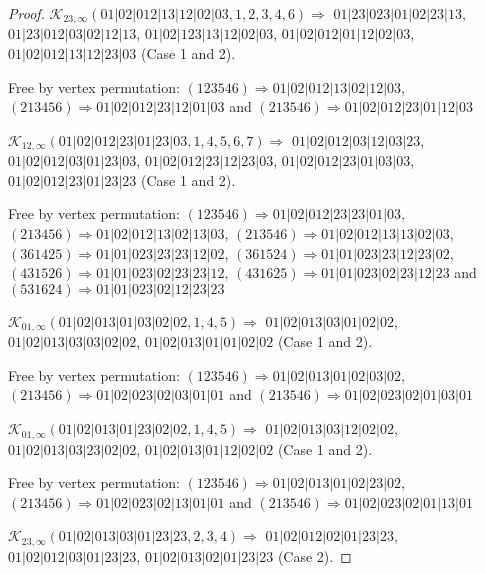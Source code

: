 \documentclass[12pt]{article}
\theoremstyle{plain}
\theoremstyle{definition}
\theoremstyle{remark}
\newcommand{\fancy}[1]{\mathcal{#1}}
\def\K{\fancy{K}}
\begin{document}
\begin{proof}
	
	\bigskip
	
	$\K_{23,\infty}(01|02|012|13|12|02|03,1, 2, 3, 4, 6)\Rightarrow $ $01|23|023|01|02|23|13$, $01|23|012|03|02|12|13$, $01|02|123|13|12|02|03$, $01|02|012|01|12|02|03$, $01|02|012|13|12|23|03$ (Case 1 and 2).
	
	
	
	Free by vertex permutation: $(1 2 3 5 4 6)\Rightarrow 01|02|012|13|02|12|03$, $(2 1 3 4 5 6)\Rightarrow 01|02|012|23|12|01|03$ and $(2 1 3 5 4 6)\Rightarrow 01|02|012|23|01|12|03$
	
	
	\bigskip
	
	$\K_{12,\infty}(01|02|012|23|01|23|03,1, 4, 5, 6, 7)\Rightarrow $ $01|02|012|03|12|03|23$, $01|02|012|03|01|23|03$, $01|02|012|23|12|23|03$, $01|02|012|23|01|03|03$, $01|02|012|23|01|23|23$ (Case 1 and 2).
	
	
	
	Free by vertex permutation: $(1 2 3 5 4 6)\Rightarrow 01|02|012|23|23|01|03$, $(2 1 3 4 5 6)\Rightarrow 01|02|012|13|02|13|03$, $(2 1 3 5 4 6)\Rightarrow 01|02|012|13|13|02|03$, $(3 6 1 4 2 5)\Rightarrow 01|01|023|23|23|12|02$, $(3 6 1 5 2 4)\Rightarrow 01|01|023|23|12|23|02$, $(4 3 1 5 2 6)\Rightarrow 01|01|023|02|23|23|12$, $(4 3 1 6 2 5)\Rightarrow 01|01|023|02|23|12|23$ and $(5 3 1 6 2 4)\Rightarrow 01|01|023|02|12|23|23$
	
	
	\bigskip
	
	$\K_{01,\infty}(01|02|013|01|03|02|02,1, 4, 5)\Rightarrow $ $01|02|013|03|01|02|02$, $01|02|013|03|03|02|02$, $01|02|013|01|01|02|02$ (Case 1 and 2).
	
	
	
	Free by vertex permutation: $(1 2 3 5 4 6)\Rightarrow 01|02|013|01|02|03|02$, $(2 1 3 4 5 6)\Rightarrow 01|02|023|02|03|01|01$ and $(2 1 3 5 4 6)\Rightarrow 01|02|023|02|01|03|01$
	
	
	\bigskip
	
	$\K_{01,\infty}(01|02|013|01|23|02|02,1, 4, 5)\Rightarrow $ $01|02|013|03|12|02|02$, $01|02|013|03|23|02|02$, $01|02|013|01|12|02|02$ (Case 1 and 2).
	
	
	
	Free by vertex permutation: $(1 2 3 5 4 6)\Rightarrow 01|02|013|01|02|23|02$, $(2 1 3 4 5 6)\Rightarrow 01|02|023|02|13|01|01$ and $(2 1 3 5 4 6)\Rightarrow 01|02|023|02|01|13|01$
	
	
	\bigskip
	
	$\K_{23,\infty}(01|02|013|03|01|23|23,2, 3, 4)\Rightarrow $ $01|02|012|02|01|23|23$, $01|02|012|03|01|23|23$, $01|02|013|02|01|23|23$ (Case 2).
	

\end{proof}
\end{document}
